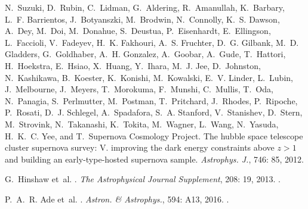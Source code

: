 \documentclass[a4paper,11pt]{article}
\begin{document}
\begin{thebibliography}{23}
N.~{Suzuki}, D.~{Rubin}, C.~{Lidman}, G.~{Aldering}, R.~{Amanullah},
  K.~{Barbary}, L.~F. {Barrientos}, J.~{Botyanszki}, M.~{Brodwin},
  N.~{Connolly}, K.~S. {Dawson}, A.~{Dey}, M.~{Doi}, M.~{Donahue},
  S.~{Deustua}, P.~{Eisenhardt}, E.~{Ellingson}, L.~{Faccioli}, V.~{Fadeyev},
  H.~K. {Fakhouri}, A.~S. {Fruchter}, D.~G. {Gilbank}, M.~D. {Gladders},
  G.~{Goldhaber}, A.~H. {Gonzalez}, A.~{Goobar}, A.~{Gude}, T.~{Hattori},
  H.~{Hoekstra}, E.~{Hsiao}, X.~{Huang}, Y.~{Ihara}, M.~J. {Jee},
  D.~{Johnston}, N.~{Kashikawa}, B.~{Koester}, K.~{Konishi}, M.~{Kowalski},
  E.~V. {Linder}, L.~{Lubin}, J.~{Melbourne}, J.~{Meyers}, T.~{Morokuma},
  F.~{Munshi}, C.~{Mullis}, T.~{Oda}, N.~{Panagia}, S.~{Perlmutter},
  M.~{Postman}, T.~{Pritchard}, J.~{Rhodes}, P.~{Ripoche}, P.~{Rosati}, D.~J.
  {Schlegel}, A.~{Spadafora}, S.~A. {Stanford}, V.~{Stanishev}, D.~{Stern},
  M.~{Strovink}, N.~{Takanashi}, K.~{Tokita}, M.~{Wagner}, L.~{Wang},
  N.~{Yasuda}, H.~K.~C. {Yee}, and T.~{Supernova Cosmology Project}.
\newblock The hubble space telescope cluster supernova survey: V. improving the
  dark energy constraints above $z>1$ and building an early-type-hosted
  supernova sample.
\newblock \emph{Astrophys. J.}, 746: 85, 2012.

G.~Hinshaw et~al.
.
\newblock \emph{The Astrophysical Journal Supplement}, 208: 19, 2013.
\newblock {}.

P.~A.~R. Ade et~al.
.
\newblock \emph{Astron. \& Astrophys.}, 594: A13, 2016.
\newblock {}.


\end{thebibliography}
\end{document}
